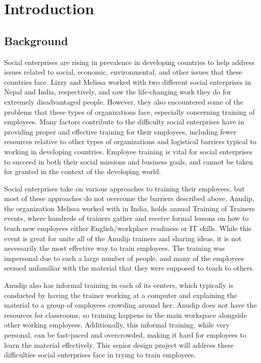 \chapter{Introduction}

\section{Background}

Social enterprises are rising in prevalence in developing countries to help address issues related to social, economic, environmental, and other issues that these countries face. Lizzy and Melissa worked with two different social enterprises in Nepal and India, respectively, and saw the life-changing work they do for extremely disadvantaged people. However, they also encountered some of the problems that these types of organizations face, especially concerning training of employees. Many factors contribute to the difficulty social enterprises have in providing proper and effective training for their employees, including fewer resources relative to other types of organizations and logistical barriers typical to working in developing countries. Employee training is vital for social enterprises to succeed in both their social missions and business goals, and cannot be taken for granted in the context of the developing world.

Social enterprises take on various approaches to training their employees, but most of these approaches do not overcome the barriers described above. Anudip, the organization Melissa worked with in India, holds annual Training of Trainers events, where hundreds of trainers gather and receive formal lessons on how to teach new employees either English/workplace readiness or IT skills. While this event is great for unite all of the Anudip trainers and sharing ideas, it is not necessarily the most effective way to train employees. The training was impersonal due to such a large number of people, and many of the employees seemed unfamiliar with the material that they were supposed to teach to others. 

Anudip also has informal training in each of its centers, which typically is conducted by having the trainer working at a computer and explaining the material to a group of employees crowding around her. Anudip does not have the resources for classrooms, so training happens in the main workspace alongside other working employees. Additionally, this informal training, while very personal, can be fast-paced and overcrowded, making it hard for employees to learn the material effectively. This senior design project will address these difficulties social enterprises face in trying to train employees.

